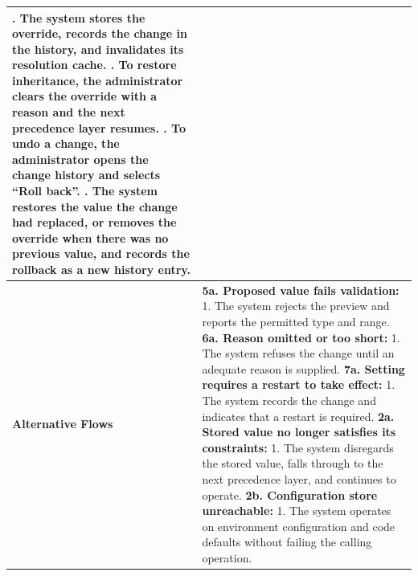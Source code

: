 \begin{longtable}{|>{\raggedright\arraybackslash}p{}|>{\raggedright\arraybackslash}p{}|}
7. The system stores the override, records the change in the history, and invalidates its resolution cache. \newline
8. To restore inheritance, the administrator clears the override with a reason and the next precedence layer resumes. \newline
9. To undo a change, the administrator opens the change history and selects ``Roll back''. \newline
10. The system restores the value the change had replaced, or removes the override when there was no previous value, and records the rollback as a new history entry. \\ \hline
\textbf{Alternative Flows} &
\textbf{5a. Proposed value fails validation:} \newline
\hspace*{1em}1. The system rejects the preview and reports the permitted type and range. \newline
\textbf{6a. Reason omitted or too short:} \newline
\hspace*{1em}1. The system refuses the change until an adequate reason is supplied. \newline
\textbf{7a. Setting requires a restart to take effect:} \newline
\hspace*{1em}1. The system records the change and indicates that a restart is required. \newline
\textbf{2a. Stored value no longer satisfies its constraints:} \newline
\hspace*{1em}1. The system disregards the stored value, falls through to the next precedence layer, and continues to operate. \newline
\textbf{2b. Configuration store unreachable:} \newline
\hspace*{1em}1. The system operates on environment configuration and code defaults without failing the calling operation. \\
\end{longtable}

